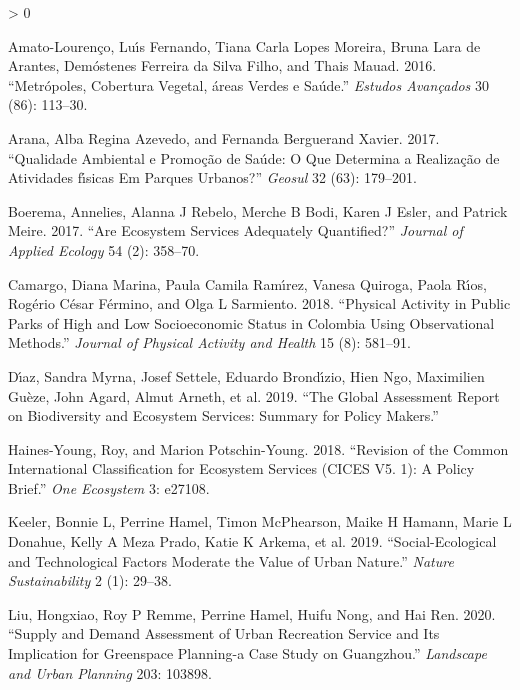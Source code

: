 \documentclass[
]{article}
\newlength{\cslhangindent}
\newenvironment{CSLReferences}[2] %
 {%
  \setlength{\parindent}{0pt}
  \ifodd #1 \everypar{\setlength{\hangindent}{\cslhangindent}}\ignorespaces\fi
  \ifnum #2 > 0
  \setlength{\parskip}{#2\baselineskip}
  \fi
 }%
 {}
\begin{document}
\hypertarget{refs}{}
\begin{CSLReferences}{1}{0}
\leavevmode\hypertarget{ref-amato2016metropoles}{}%
Amato-Lourenço, Luı́s Fernando, Tiana Carla Lopes Moreira, Bruna Lara de
Arantes, Demóstenes Ferreira da Silva Filho, and Thais Mauad. 2016.
{``Metr{ó}poles, Cobertura Vegetal, {á}reas Verdes e Sa{ú}de.''}
\emph{Estudos Avan{ç}ados} 30 (86): 113--30.

\leavevmode\hypertarget{ref-arana2017qualidade}{}%
Arana, Alba Regina Azevedo, and Fernanda Berguerand Xavier. 2017.
{``Qualidade Ambiental e Promo{ç}{ã}o de Sa{ú}de: O Que Determina a
Realiza{ç}{ã}o de Atividades f{ı́}sicas Em Parques Urbanos?''}
\emph{Geosul} 32 (63): 179--201.

\leavevmode\hypertarget{ref-boerema2017ecosystem}{}%
Boerema, Annelies, Alanna J Rebelo, Merche B Bodi, Karen J Esler, and
Patrick Meire. 2017. {``Are Ecosystem Services Adequately Quantified?''}
\emph{Journal of Applied Ecology} 54 (2): 358--70.

\leavevmode\hypertarget{ref-camargo2018physical}{}%
Camargo, Diana Marina, Paula Camila Ramı́rez, Vanesa Quiroga, Paola Rı́os,
Rogério César Férmino, and Olga L Sarmiento. 2018. {``Physical Activity
in Public Parks of High and Low Socioeconomic Status in Colombia Using
Observational Methods.''} \emph{Journal of Physical Activity and Health}
15 (8): 581--91.

\leavevmode\hypertarget{ref-diaz2019global}{}%
Dı́az, Sandra Myrna, Josef Settele, Eduardo Brondı́zio, Hien Ngo,
Maximilien Guèze, John Agard, Almut Arneth, et al. 2019. {``The Global
Assessment Report on Biodiversity and Ecosystem Services: Summary for
Policy Makers.''}

\leavevmode\hypertarget{ref-haines2018revision}{}%
Haines-Young, Roy, and Marion Potschin-Young. 2018. {``Revision of the
Common International Classification for Ecosystem Services (CICES V5.
1): A Policy Brief.''} \emph{One Ecosystem} 3: e27108.

\leavevmode\hypertarget{ref-keeler2019social}{}%
Keeler, Bonnie L, Perrine Hamel, Timon McPhearson, Maike H Hamann, Marie
L Donahue, Kelly A Meza Prado, Katie K Arkema, et al. 2019.
{``Social-Ecological and Technological Factors Moderate the Value of
Urban Nature.''} \emph{Nature Sustainability} 2 (1): 29--38.

\leavevmode\hypertarget{ref-liu2020supply}{}%
Liu, Hongxiao, Roy P Remme, Perrine Hamel, Huifu Nong, and Hai Ren.
2020. {``Supply and Demand Assessment of Urban Recreation Service and
Its Implication for Greenspace Planning-a Case Study on Guangzhou.''}
\emph{Landscape and Urban Planning} 203: 103898.


\end{CSLReferences}
\end{document}
